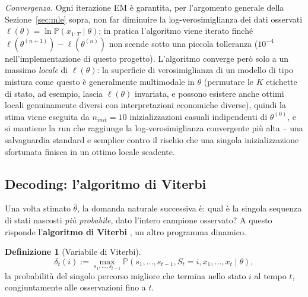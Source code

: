 \documentclass[11pt]{article}
\theoremstyle{definition}
\newtheorem{definition}[theorem]{Definizione}
\theoremstyle{remark}
\begin{document}
\emph{Convergenza.} Ogni iterazione EM \`e garantita, per l'argomento generale della Sezione~\ref{sec:mle} sopra, non far diminuire la log-verosimiglianza dei dati osservati $\ell(\theta)=\ln\mathbb{P}(x_{1:T}\mid\theta)$; in pratica l'algoritmo viene iterato finch\'e $\ell(\theta^{(n+1)})-\ell(\theta^{(n)})$ non scende sotto una piccola tolleranza ($10^{-4}$ nell'implementazione di questo progetto). L'algoritmo converge per\`o solo a un massimo \emph{locale} di $\ell(\theta)$: la superficie di verosimiglianza di un modello di tipo mistura come questo \`e generalmente multimodale in $\theta$ (permutare le $K$ etichette di stato, ad esempio, lascia $\ell(\theta)$ invariata, e possono esistere anche ottimi locali genuinamente diversi con interpretazioni economiche diverse), quindi la stima viene eseguita da $n_{init}=10$ inizializzazioni casuali indipendenti di $\theta^{(0)}$, e si mantiene la run che raggiunge la log-verosimiglianza convergente pi\`u alta -- una salvaguardia standard e semplice contro il rischio che una singola inizializzazione sfortunata finisca in un ottimo locale scadente.

\subsection{Decoding: l'algoritmo di Viterbi}
\label{sec:viterbi}

Una volta stimato $\widehat\theta$, la domanda naturale successiva \`e: qual \`e la singola sequenza di stati nascosti \emph{pi\`u probabile}, dato l'intero campione osservato? A questo risponde l'\textbf{algoritmo di Viterbi} \cite{viterbi1967}, un altro programma dinamico.

\begin{definition}[Variabile di Viterbi]
\[
\delta_t(i) := \max_{s_1,\dots,s_{t-1}}\mathbb{P}(s_1,\dots,s_{t-1},S_t=i,x_1,\dots,x_t\mid\theta),
\]
la probabilit\`a del singolo percorso migliore che termina nello stato $i$ al tempo $t$, congiuntamente alle osservazioni fino a $t$.
\end{definition}
\end{document}
